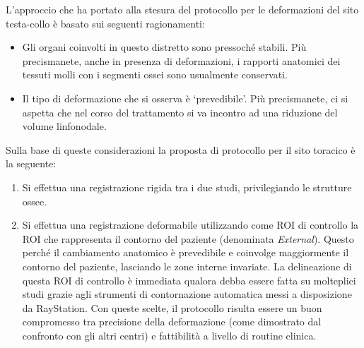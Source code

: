 L'approccio che ha portato alla stesura del protocollo per le deformazioni del sito testa-collo è basato sui seguenti ragionamenti:
\begin{itemize}
\item Gli organi coinvolti in questo distretto sono pressoché stabili. Più precismanete, anche in presenza di deformazioni, i rapporti anatomici dei tessuti molli con i segmenti ossei sono usualmente conservati.
\item Il tipo di deformazione che si osserva è `prevedibile'. Più precismanete, ci si aspetta che nel corso del trattamento si va incontro ad una riduzione del volume linfonodale.
\end{itemize}
Sulla base di queste considerazioni la proposta di protocollo per il sito toracico è la seguente:
\begin{enumerate}
\item Si effettua una registrazione rigida tra i due studi, privilegiando le strutture ossee.
\item Si effettua una registrazione deformabile utilizzando come ROI di controllo la ROI che rappresenta il contorno del paziente (denominata \textit{External}). Questo perché il cambiamento anatomico è prevedibile e coinvolge maggiormente il contorno del paziente, lasciando le zone interne invariate. La delineazione di questa ROI di controllo è immediata qualora debba essere fatta su molteplici studi grazie agli strumenti di contornazione automatica messi a disposizione da RayStation. Con queste scelte, il protocollo risulta essere un buon compromesso tra precisione della deformazione (come dimostrato dal confronto con gli altri centri) e fattibilità a livello di routine clinica.
\end{enumerate}


